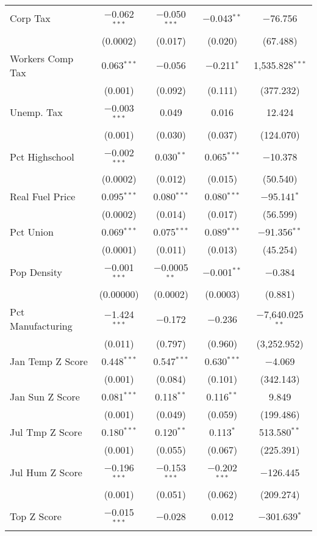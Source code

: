 \begin{table}[!htbp]
\begin{tabular}{@{\extracolsep{5pt}}lcccc}
  Corp Tax & $-$0.062$^{***}$ & $-$0.050$^{***}$ & $-$0.043$^{**}$ & $-$76.756 \\ 
  & (0.0002) & (0.017) & (0.020) & (67.488) \\ 
  Workers Comp Tax & 0.063$^{***}$ & $-$0.056 & $-$0.211$^{*}$ & 1,535.828$^{***}$ \\ 
  & (0.001) & (0.092) & (0.111) & (377.232) \\ 
  Unemp. Tax & $-$0.003$^{***}$ & 0.049 & 0.016 & 12.424 \\ 
  & (0.001) & (0.030) & (0.037) & (124.070) \\ 
  Pct Highschool & $-$0.002$^{***}$ & 0.030$^{**}$ & 0.065$^{***}$ & $-$10.378 \\ 
  & (0.0002) & (0.012) & (0.015) & (50.540) \\ 
  Real Fuel Price & 0.095$^{***}$ & 0.080$^{***}$ & 0.080$^{***}$ & $-$95.141$^{*}$ \\ 
  & (0.0002) & (0.014) & (0.017) & (56.599) \\ 
  Pct Union & 0.069$^{***}$ & 0.075$^{***}$ & 0.089$^{***}$ & $-$91.356$^{**}$ \\ 
  & (0.0001) & (0.011) & (0.013) & (45.254) \\ 
  Pop Density & $-$0.001$^{***}$ & $-$0.0005$^{**}$ & $-$0.001$^{**}$ & $-$0.384 \\ 
  & (0.00000) & (0.0002) & (0.0003) & (0.881) \\ 
  Pct Manufacturing & $-$1.424$^{***}$ & $-$0.172 & $-$0.236 & $-$7,640.025$^{**}$ \\ 
  & (0.011) & (0.797) & (0.960) & (3,252.952) \\ 
  Jan Temp Z Score & 0.448$^{***}$ & 0.547$^{***}$ & 0.630$^{***}$ & $-$4.069 \\ 
  & (0.001) & (0.084) & (0.101) & (342.143) \\ 
  Jan Sun Z Score & 0.081$^{***}$ & 0.118$^{**}$ & 0.116$^{**}$ & 9.849 \\ 
  & (0.001) & (0.049) & (0.059) & (199.486) \\ 
  Jul Tmp Z Score & 0.180$^{***}$ & 0.120$^{**}$ & 0.113$^{*}$ & 513.580$^{**}$ \\ 
  & (0.001) & (0.055) & (0.067) & (225.391) \\ 
  Jul Hum Z Score & $-$0.196$^{***}$ & $-$0.153$^{***}$ & $-$0.202$^{***}$ & $-$126.445 \\ 
  & (0.001) & (0.051) & (0.062) & (209.274) \\ 
  Top Z Score & $-$0.015$^{***}$ & $-$0.028 & 0.012 & $-$301.639$^{*}$ \\ 

\end{tabular}
\end{table}
